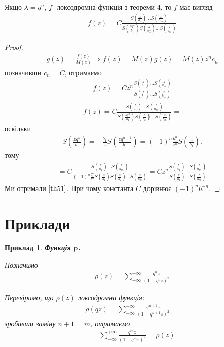 \documentclass[12pt,a4paper]{article}
\begin{document}
\begin{thm}
Якщо $\lambda =q^{n}$, $f$- локсодромна функція з теореми 4, то  $f$ має вигляд
\begin{equation}\label{th51}
\begin{array}{l}
 f(z)= C\tfrac{S(\frac{z}{a_{1}})...S(\frac{z}{a_{m}})}{S(\frac{zq^{n}}{b_{1}})S(\frac{z}{b_{2}})...S(\frac{z}{b_{m}})}
\end{array}
\end{equation}
 \end{thm}
\begin{proof}
\[\begin{array}{l}
g(z)=\frac{f(z)}{M(z)}\Rightarrow f(z)=M(z)g(z)= M(z)z^{n}c_{n}
 \end{array}\]
 позначивши $c_{n}=C$, отримаємо 
\[\begin{array}{l} 
f(z) =Cz^{n}\frac{S(\frac{z}{a_{1}})...S(\frac{z}{a_{m}})}{S(\frac{z}{b_{1}})...S(\frac{z}{b_{m}})} 
\end{array}\]
\[\begin{array}{l}
f(z)=C\tfrac{S(\frac{z}{a_{1}})...S(\frac{z}{a_{m}})}{S(\frac{zq^{n}}{b_{1}})S(\frac{z}{b_{2}})...S(\frac{z}{b_{m}})}= 
 \end{array}\]
оскільки
\[\begin{array}{l}
S(\frac{zq^{n}}{b_{1}})= -\frac{b_{1}}{z}S(\frac{zq^{n-1}}{b_{1}})=(-1)^{n}\frac{b_{1}^{n}}{z^{n}}S(\frac{z}{b_{1}}).
 \end{array}\]
тому
\[\begin{array}{l}
 =C\tfrac{S(\frac{z}{a_{1}})...S(\frac{z}{a_{m}})}{(-1)^{n}\frac{b_{1}^{n}}{z^{n}} S(\frac{z}{b_{1}})S(\frac{z}{b_{2}})...S(\frac{z}{b_{m}})}=Cz^{n}\frac{S(\frac{z}{a_{1}})...S(\frac{z}{a_{m}})}{S(\frac{z}{b_{1}})...S(\frac{z}{b_{m}})} 
  \end{array}\]
Ми отримали $\eqref{th51}$. При чому константа $C$ дорівнює $(-1)^{n}b_{1}^{-n}$.
\end{proof}


\clearpage
\section{Приклади}

\newtheorem{pryk}{Приклад}
\begin{pryk}
\textit{\textbf{Функція $\mathbf{\rho}$.}}
\begin{ozn}
  Позначимо
  \[\begin{array}{l}
   \rho(z)=\sum^{+\infty}_{-\infty}  \frac{q^{n}z}{(1-q^{n}z)^2}
  \end{array}\]
\end{ozn}
Перевіримо, що $\rho(z)$ локсодромна функція:\\
\[\begin{array}{l}
 \rho(qz)=\sum^{+\infty}_{-\infty}  \frac{q^{n+1}z}{(1-q^{n+1}z)^2}=
\end{array}\]
зробивши заміну $n+1=m$, отримаємо
\[\begin{array}{l}
=\sum^{+\infty}_{-\infty}  \frac{q^{m}z}{(1-q^{m}z)^2}=\rho(z)
\end{array}\]
\end{pryk}
\[\begin{array}{l}
\end{array}\]
\end{document}
